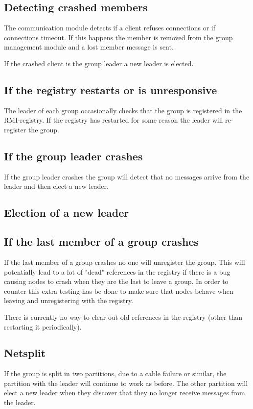 \documentclass[english]{article}
\begin{document}
\subsection{Detecting crashed members}
The communication module detects if a client refuses connections or if connections timeout. If this happens the member is removed from the group management module and a lost member message is sent.

If the crashed client is the group leader a new leader is elected.

\subsection{If the registry restarts or is unresponsive}
The leader of each group occasionally checks that the group is registered in the RMI-registry. If the registry has restarted for some reason the leader will re-register the group.

\subsection{If the group leader crashes}
If the group leader crashes the group will detect that no messages arrive from the leader and then elect a new leader. 

\subsection{Election of a new leader}

\subsection{If the last member of a group crashes}
If the last member of a group crashes no one will unregister the group.
This will potentially lead to a lot of "dead" references in the registry if there is a bug causing nodes to crash when they are the last to leave a group. In order to counter this extra testing has be done to make sure that nodes behave when leaving and unregistering with the registry.

There is currently no way to clear out old references in the registry (other than restarting it periodically).

\subsection{Netsplit}
If the group is split in two partitions, due to a cable failure or similar, the partition with the leader will continue to work as before. The other partition will elect a new leader when they discover that they no longer receive messages from the leader.
\end{document}
